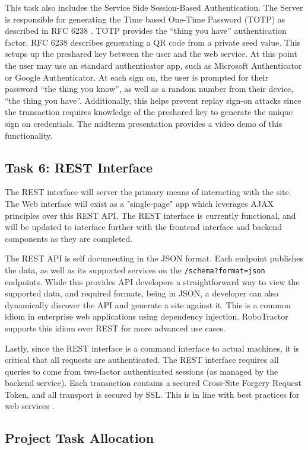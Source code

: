 \documentclass[conference,12pt]{IEEEtran}
\begin{document}
This task also includes the Service Side Session-Based Authentication. The
Server is responsible for generating the Time based One-Time Password (TOTP) as described in RFC 6238
\autocite{rydell_totp_2011}.  TOTP provides the ``thing you have''
authentication factor. RFC 6238 describes generating a QR code from a private
seed value. This setups up the preshared key between the user and the web
service. At this point the user may use an standard authenticator app, such as
Microsoft Authenticator or Google Authenticator. At each sign on, the user is
prompted for their password ``the thing you know'', as well as a random number
from their device, ``the thing you have''.  Additionally, this helps prevent
replay sign-on attacks since the transaction requires knowledge of the
preshared key to generate the unique sign on credentials. The midterm
presentation provides a video demo of this functionality.

\subsection{Task 6: REST Interface}
The REST interface will server the primary means of interacting with the site.
The Web interface will exist as a "single-page" app which leverages AJAX
principles over this REST API. The REST interface is currently functional, and
will be updated to interface further with the frontend interface and backend
components as they are completed.

The REST API is self documenting in the JSON format. Each endpoint publishes the
data, as well as its supported services on the \texttt{/schema?format=json}
endpoints. While this provides API developers a straightforward way to view the
supported data, and required formats, being in JSON, a developer can also
dynamically discover the API and generate a site against it.  This is a common
idiom in enterprise web applications using dependency injection.  RoboTractor
supports this idiom over REST for more advanced use cases.

Lastly, since the REST interface is a command interface to actual machines, it
is critical that all requests are authenticated. The REST interface requires all
queries to come from two-factor authenticated sessions (as managed by the
backend service).  Each transaction contains a secured Cross-Site Forgery
Request Token, and all transport is secured by SSL. This is in line with best
practices for web services \autocite{ibm_best_2002}.

\subsection{Project Task Allocation}
\end{document}
